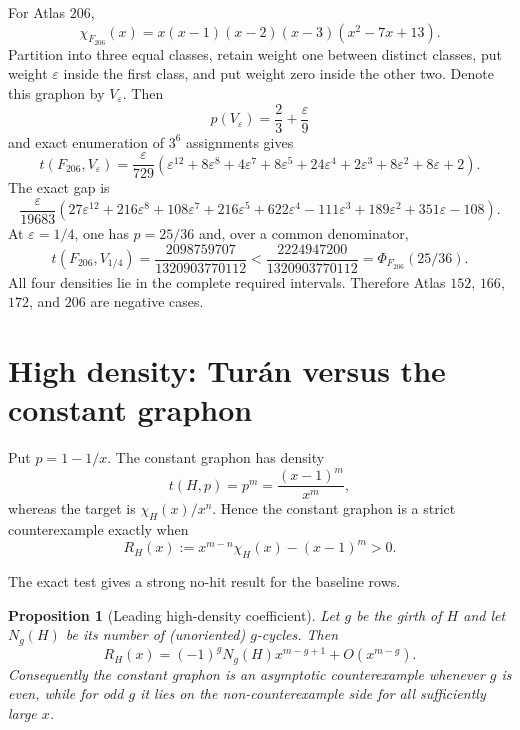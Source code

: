 \documentclass[11pt]{article}
\newtheorem{proposition}[theorem]{Proposition}
\begin{document}
For Atlas $206$,
\[
 \chi_{F_{206}}(x)
 =x(x-1)(x-2)(x-3)(x^2-7x+13).
\]
Partition into three equal classes, retain weight one between distinct
classes, put weight $\varepsilon$ inside the first class, and put weight zero
inside the other two.  Denote this graphon by $V_\varepsilon$.  Then
\[
 p(V_\varepsilon)=\frac23+\frac\varepsilon9
\]
and exact enumeration of $3^6$ assignments gives
\[
 t(F_{206},V_\varepsilon)
 =\frac{\varepsilon}{729}
 \left(
 \varepsilon^{12}+8\varepsilon^8+4\varepsilon^7
 +8\varepsilon^5+24\varepsilon^4+2\varepsilon^3
 +8\varepsilon^2+8\varepsilon+2
 \right).
\]
The exact gap is
\[
 \frac{\varepsilon}{19683}
 \left(
 27\varepsilon^{12}+216\varepsilon^8+108\varepsilon^7
 +216\varepsilon^5+622\varepsilon^4-111\varepsilon^3
 +189\varepsilon^2+351\varepsilon-108
 \right).
\]
At $\varepsilon=1/4$, one has $p=25/36$ and, over a common denominator,
\[
 t(F_{206},V_{1/4})
 =\frac{2098759707}{1320903770112}
 <\frac{2224947200}{1320903770112}
 =\Phi_{F_{206}}(25/36).
\]
All four densities lie in the complete required intervals.  Therefore
Atlas $152$, $166$, $172$, and $206$ are negative cases.


\section{High density: Tur\'an versus the constant graphon}

Put $p=1-1/x$.  The constant graphon has density
\[
 t(H,p)=p^m=\frac{(x-1)^m}{x^m},
\]
whereas the target is $\chi_H(x)/x^n$.  Hence the constant graphon is a
strict counterexample exactly when
\begin{equation}
 R_H(x):=x^{m-n}\chi_H(x)-(x-1)^m>0.
 \label{eq:R}
\end{equation}

The exact test gives a strong no-hit result for the baseline rows.

\begin{proposition}[Leading high-density coefficient]\label{prop:girth-leading}
Let $g$ be the girth of $H$ and let $N_g(H)$ be its number of (unoriented)
$g$-cycles.  Then
\[
 R_H(x)=(-1)^gN_g(H)x^{m-g+1}+O(x^{m-g}).
\]
Consequently the constant graphon is an asymptotic counterexample whenever
$g$ is even, while for odd $g$ it lies on the non-counterexample side for
all sufficiently large $x$.
\end{proposition}
\end{document}
